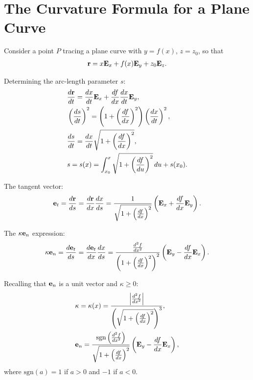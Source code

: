 \documentclass[
  letterpaper,
  DIV=11,
  numbers=noendperiod]{scrreprt}
\newcommand{\lp}{\left(}
\newcommand{\rp}{\right)}
\begin{document}
\section{The Curvature Formula for a Plane
Curve}\label{the-curvature-formula-for-a-plane-curve}

Consider a point \(P\) tracing a plane curve with \(y = f(x)\),
\(z = z_0\), so that \begin{align}
    {\bf r} = x{\bf E}_x+f(x){\bf E}_y+z_0{\bf E}_z.
\end{align}

Determining the arc-length parameter \(s\): \begin{align}
    \begin{split}
        & \frac{d{\bf r}}{dt} = \frac{dx}{dt}{\bf E}_x+\frac{df}{dx}\frac{dx}{dt}{\bf E}_y,\\
        & \lp\frac{ds}{dt}\rp^2 = \lp 1+\lp\frac{df}{dx}\rp^2\rp\lp\frac{dx}{dt}\rp^2,\\
        & \frac{ds}{dt} = \frac{dx}{dt}\sqrt{1+\lp\frac{df}{dx}\rp^2},\\
        & s = s(x) = \int_{x_0}^x\sqrt{1+\lp\frac{df}{du}\rp^2}\,du+s(x_0).
    \end{split}
\end{align}

The tangent vector: \begin{align}
    {\bf e}_t = \frac{d{\bf r}}{ds} = \frac{d{\bf r}}{dx}\frac{dx}{ds} = \frac{1}{\sqrt{1+\lp\frac{df}{dx}\rp^2}}\lp{\bf E}_x+\frac{df}{dx}{\bf E}_y\rp.
\end{align}

The \(\kappa{\bf e}_n\) expression: \begin{align}
    \kappa{\bf e}_n = \frac{d{\bf e}_t}{ds} = \frac{d{\bf e}_t}{dx}\frac{dx}{ds} = \frac{\frac{d^2 f}{dx^2}}{\lp1+\lp \frac{df}{dx}\rp^2\rp^2}\lp{\bf E}_y-\frac{df}{dx}{\bf E}_x\rp.
\end{align}

Recalling that \({\bf e}_n\) is a unit vector and \(\kappa \geq 0\):
\begin{align}
    \begin{split}
        & \kappa = \kappa(x) = \frac{\left|\frac{d^2 f}{dx^2}\right|}{\lp\sqrt{1+\lp\frac{df}{dx}\rp^2}\rp^3},\\
        & {\bf e}_n = \frac{\text{sgn}\lp\frac{d^2 f}{dx^2}\rp}{\sqrt{1+\lp\frac{df}{dx}\rp^2}}\lp{\bf E}_y-\frac{df}{dx}{\bf E}_x\rp,
    \end{split}
\end{align} where \(\text{sgn}(a)=1\) if \(a>0\) and \(-1\) if \(a<0\).
\end{document}

